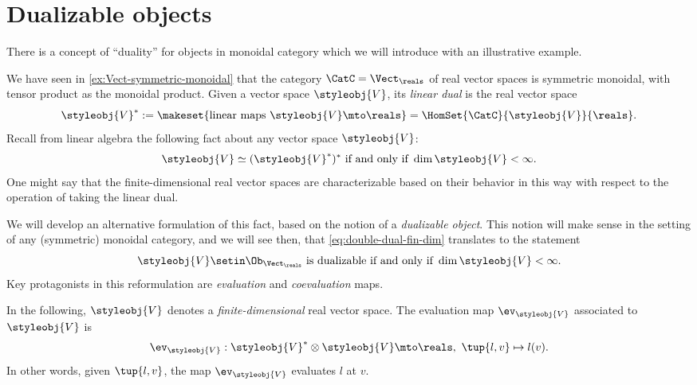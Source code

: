 
\section{Dualizable objects}
\label{sec:dual-objects}
There is a concept of ``duality'' for objects in monoidal category which we will introduce with an illustrative example.

We have seen in \cref{ex:Vect-symmetric-monoidal} that the category $\CatC = \Vect_{\reals}$ of real vector spaces is symmetric monoidal, with tensor product as the monoidal product.
Given a vector space $\styleobj{V} $, its \emph{linear dual} is the real vector space
\begin{equation}
    \label{eq:lin-dual-vecsp}
    \styleobj{V} ^{*} := \makeset{ \text{linear maps } \styleobj{V} \mto \reals } = \HomSet{\CatC}{\styleobj{V}}{ \reals}.
\end{equation}
%
Recall from linear algebra the following fact about any vector space $\styleobj{V} $:
%
\begin{equation}
    \label{eq:double-dual-fin-dim}
    \styleobj{V}  \simeq (\styleobj{V} ^{*})^* \text{ if and only if } \dim \styleobj{V}  < \infty.
\end{equation}
%
One might say that the finite-dimensional real vector spaces are characterizable based on their behavior in this way with respect to the operation of taking the linear dual.

We will develop an alternative formulation of this fact, based on the notion of a \emph{dualizable object}.
This notion will make sense in the setting of any (symmetric) monoidal category, and we will see then, that \cref{eq:double-dual-fin-dim} translates to the statement
\begin{equation}
    \label{eq:dualizable-fin-dim}
    \styleobj{V}  \setin \Ob_{\Vect_\reals} \text{ is dualizable if and only if } \dim \styleobj{V}  < \infty.
\end{equation}
%
Key protagonists in this reformulation are \emph{evaluation} and \emph{coevaluation} maps.

In the following,  $\styleobj{V} $ denotes a \emph{finite-dimensional} real vector space.
The evaluation map $\ev_\styleobj{V} $ associated to $\styleobj{V} $ is
\begin{equation}
    \label{eq:evaluation-vecsp}
    \ev_\styleobj{V}  : \styleobj{V}^* \otimes \styleobj{V}  \mto \reals, \ \tup{l, v} \mapsto l(v).
\end{equation}
In other words, given $\tup{l, v}$, the map $\ev_\styleobj{V} $ evaluates $l$ at $v$.

